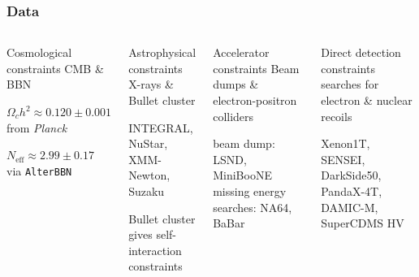 \documentclass[aspectratio=169]{beamer}
\begin{document}
\begin{frame}
    \frametitle{Data}
    \begin{columns}
        \begin{block}{Cosmological constraints}
                CMB \& BBN

            $\Omega_c h^2 \approx 0.120\pm0.001$ from \textit{Planck}

            $N_\text{eff}\approx 2.99\pm 0.17$ via \texttt{AlterBBN}
        \end{block}
        \begin{block}{Astrophysical constraints}
            X-rays \& Bullet cluster



            INTEGRAL, NuStar, XMM-Newton, Suzaku

            Bullet cluster gives self-interaction constraints%
        \end{block}
        \begin{block}{Accelerator constraints}
            Beam dumps \& electron-positron colliders


            beam dump: LSND, MiniBooNE
            missing energy searches: NA64, BaBar
        \end{block}
        \begin{block}{Direct detection constraints}
            searches for electron \& nuclear recoils

            Xenon1T, SENSEI, DarkSide50, PandaX-4T, DAMIC-M, SuperCDMS HV
        \end{block}
    \end{columns}
\end{frame}

{
    \begin{frame}[plain]
    \end{frame}
}
\end{document}
